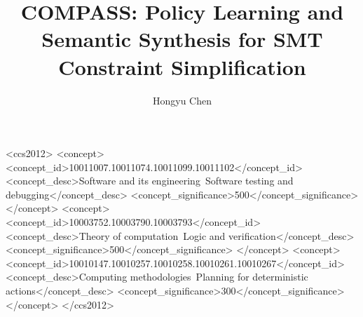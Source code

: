 \documentclass[acmsmall,screen,review,anonymous]{acmart}
\begin{document}
\title{COMPASS: Policy Learning and Semantic Synthesis for SMT Constraint Simplification}

\author{Hongyu Chen}






\begin{CCSXML}
<ccs2012>
<concept>
<concept_id>10011007.10011074.10011099.10011102</concept_id>
<concept_desc>Software and its engineering~Software testing and debugging</concept_desc>
<concept_significance>500</concept_significance>
</concept>
<concept>
<concept_id>10003752.10003790.10003793</concept_id>
<concept_desc>Theory of computation~Logic and verification</concept_desc>
<concept_significance>500</concept_significance>
</concept>
<concept>
<concept_id>10010147.10010257.10010258.10010261.10010267</concept_id>
<concept_desc>Computing methodologies~Planning for deterministic actions</concept_desc>
<concept_significance>300</concept_significance>
</concept>
</ccs2012>
\end{CCSXML}

\end{document}
